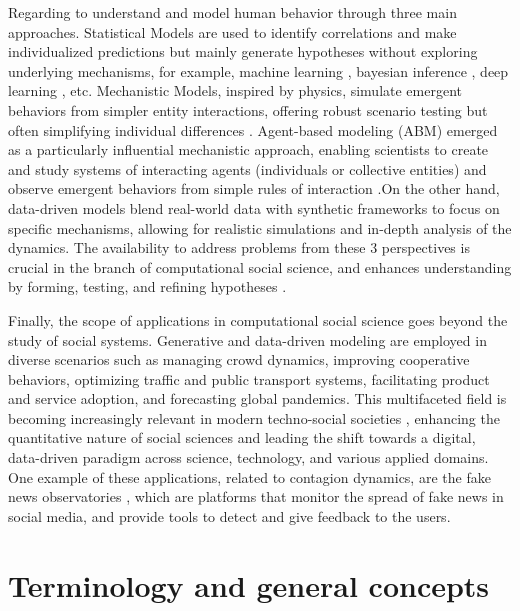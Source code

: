 Regarding to understand and model human behavior through three main approaches. Statistical Models are used to identify correlations and make individualized predictions but mainly generate hypotheses without exploring underlying mechanisms, for example, machine learning \cite{murphy-2012}, bayesian inference \cite{gelman1995bayesian}, deep learning \cite{goodfellow-2016}, etc. Mechanistic Models, inspired by physics, simulate emergent behaviors from simpler entity interactions, offering robust scenario testing but often simplifying individual differences \cite{axelrod2006agent}. Agent-based modeling (ABM) emerged as a particularly influential mechanistic approach, enabling scientists to create and study systems of interacting agents (individuals or collective entities) and observe emergent behaviors from simple rules of interaction \cite{epstein1999agent}.On the other hand, data-driven models blend real-world data with synthetic frameworks to focus on specific mechanisms, allowing for realistic simulations and in-depth analysis of the dynamics. The availability to address problems from these 3 perspectives is crucial in the branch of computational social science, and enhances understanding by forming, testing, and refining hypotheses \cite{watts2004new}.

Finally, the scope of applications in computational social science goes beyond the study of social systems. Generative and data-driven modeling are employed in diverse scenarios such as managing crowd dynamics, improving cooperative behaviors, optimizing traffic and public transport systems, facilitating product and service adoption, and forecasting global pandemics. This multifaceted field is becoming increasingly relevant in modern techno-social societies \cite{vespignani2009predicting}, enhancing the quantitative nature of social sciences and leading the shift towards a digital, data-driven paradigm across science, technology, and various applied domains. One example of these applications, related to contagion dynamics, are the fake news observatories \cite{Polis-observatory, EDMO-observatory, committed-observatory-2023}, which are platforms that monitor the spread of fake news in social media, and provide tools to detect and give feedback to the users.

\section{\label{sec:Terminology and general concepts} Terminology and general concepts}

